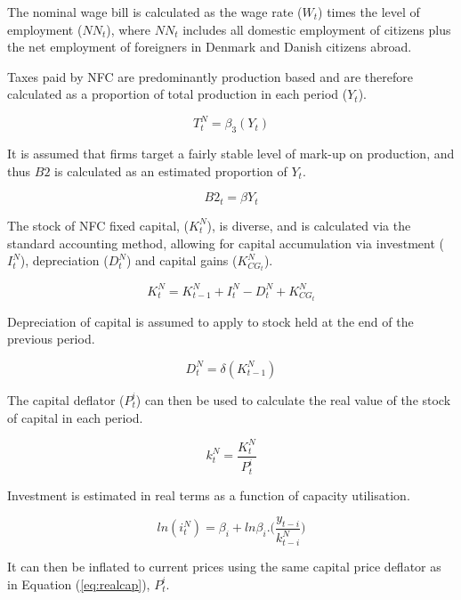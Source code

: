 \documentclass[
]{book}
\begin{document}
The nominal wage bill is calculated as the wage rate (\(W_t\)) times the
level of employment (\(NN_t\)), where \(NN_t\) includes all domestic employment
of citizens plus the net employment of foreigners in Denmark and Danish citizens abroad.

Taxes paid by NFC are predominantly production based and are therefore
calculated as a proportion of total production in each period (\(Y_t\)).

\begin{equation}
T^N_t = \beta _3(Y_t)
\end{equation}

It is assumed that firms target a fairly stable level of mark-up on production,
and thus \(B2\) is calculated as an estimated proportion of \(Y_t\).

\begin{equation}
B2_t = \beta Y_t
\end{equation}

The stock of NFC fixed capital, (\(K^N_t\)), is diverse, and is calculated via the
standard accounting method, allowing for capital accumulation via investment (\(I^N_t\)),
depreciation (\(D^N_t\)) and capital gains (\(K^N_{CG_t}\)).

\begin{equation}
K^N_t = K^N_{t-1} + I^N_t - D^N_t + K^N_{CG_t}
\end{equation}

Depreciation of capital is assumed to apply to stock held at the end of the previous
period.

\begin{equation}
D^N_t = \delta (K^N_{t-1})
\end{equation}

The capital deflator (\(P^i_t\)) can then be used to calculate the real
value of the stock of capital in each period.

\begin{equation}
k^N_t = \frac{K^N_t}{P^i_t}
\label{eq:realcap}
\end{equation}

Investment is estimated in real terms as a function of capacity utilisation.

\begin{equation}
ln(i^N_t) = \beta _i + ln\beta _i. \Bigg( \frac{y_{t-i}}{k^N_{t-i}}\Bigg)
\end{equation}

It can then be inflated to current prices using the same capital price deflator as in Equation (\ref{eq:realcap}), \(P^i_t\).
\end{document}
